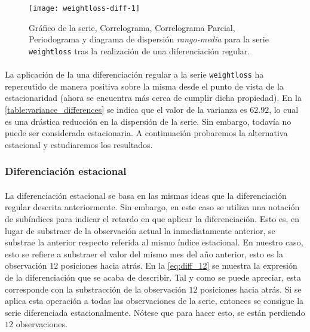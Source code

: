 \documentclass[a4paper, spanish]{article}
\begin{document}
        \begin{figure}[htb!]
          \texttt{[image: weightloss-diff-1]}
          \caption{Gráfico de la serie, Correlograma, Correlograma Parcial, Periodograma y diagrama de dispersión \emph{rango-media} para la serie \texttt{weightloss} tras la realización de una diferenciación regular.}
          \label{img:weightloss_diff_1}
        \end{figure}

        \paragraph{}
        La aplicación de la una diferenciación regular a la serie \texttt{weightloss} ha repercutido de manera positiva sobre la misma desde el punto de vista de la estacionaridad (ahora se encuentra más cerca de cumplir dicha propiedad). En la \autoref{table:variance_differences} se indica que el valor de la varianza es $62.92$, lo cual es una drástica reducción en la dispersión de la serie. Sin embargo, todavía no puede ser considerada estacionaria. A continuación probaremos la alternativa estacional y estudiaremos los resultados.

      \subsubsection{Diferenciación estacional}
      \label{sec:seasonal_difference}

        \paragraph{}
        La diferenciación estacional se basa en las mismas ideas que la diferenciación regular descrita anteriormente. Sin embargo, en este caso se utiliza una notación de subíndices para indicar el retardo en que aplicar la diferenciación. Esto es, en lugar de substraer de la observación actual la inmediatamente anterior, se substrae la anterior respecto referida al mismo índice estacional. En nuestro caso, esto se refiere a substraer el valor del mismo mes del año anterior, esto es la observación $12$ posiciones hacia atrás. En la \autoref{eq:diff_12} se muestra la expresión de la diferenciación que se acaba de describir. Tal y como se puede apreciar, esta corresponde con la substracción de la observación $12$ posiciones hacia atrás. Si se aplica esta operación a todas las observaciones de la serie, entonces se consigue la serie diferenciada estacionalmente. Nótese que para hacer esto, se están perdiendo $12$ observaciones.
\end{document}
